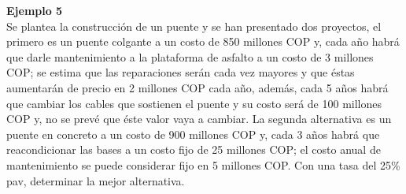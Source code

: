 \textbf{Ejemplo 5}\\
Se plantea la construcción de un puente y se han presentado dos proyectos, el primero es un puente colgante a un costo de 850 millones COP y, cada año habrá que darle mantenimiento a la plataforma de asfalto a un costo de 3 millones COP; se estima que las reparaciones serán cada vez mayores y que éstas aumentarán de precio en 2 millones COP cada año, además, cada 5 años habrá que cambiar los cables que sostienen el puente y su costo será de 100 millones COP y, no se prevé que éste valor vaya a cambiar. La segunda alternativa es un puente en concreto a un costo de 900 millones COP y, cada 3 años habrá que reacondicionar las bases a un costo fijo de 25 millones COP; el costo anual de mantenimiento se puede considerar fijo en 5 millones COP. Con una tasa del 25\% pav, determinar la mejor alternativa.\\



